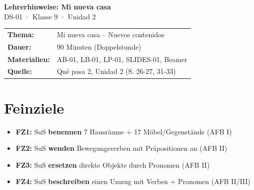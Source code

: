 \documentclass[11pt, a4paper]{article}
\begin{document}

\begin{center}
    {\LARGE\bfseries Lehrerhinweise: Mi nueva casa}\\[6pt]
    {\large DS-01 · Klasse 9 · Unidad 2}
\end{center}

\vspace{8pt}


\begin{infobox}[Stundenübersicht]
\begin{tabular}{@{}ll@{}}
\textbf{Thema:} & Mi nueva casa -- Nuevos contenidos \\
\textbf{Dauer:} & 90 Minuten (Doppelstunde) \\
\textbf{Materialien:} & AB-01, LB-01, LP-01, SLIDES-01, Beamer \\
\textbf{Quelle:} & Qué pasa 2, Unidad 2 (S. 26-27, 31-33) \\
\end{tabular}
\end{infobox}

\vspace{8pt}


\section*{Feinziele}

\begin{itemize}[leftmargin=1.5em]
    \item \textbf{FZ1:} SuS \textbf{benennen} 7 Hausräume + 17 Möbel/Gegenstände (AFB I)
    \item \textbf{FZ2:} SuS \textbf{wenden} Bewegungsverben mit Präpositionen an (AFB II)
    \item \textbf{FZ3:} SuS \textbf{ersetzen} direkte Objekte durch Pronomen (AFB II)
    \item \textbf{FZ4:} SuS \textbf{beschreiben} einen Umzug mit Verben + Pronomen (AFB II/III)
\end{itemize}
\end{document}
